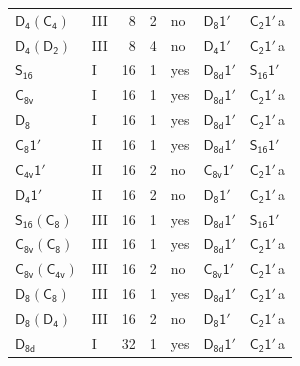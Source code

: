 \documentclass[10pt,a4paper]{article}
\numberwithin{equation}{section}
\newcommand{\grp}[1]{\mathsf{#1}}
\newcommand{\clsletter}[1]{\,{\scriptsize\color{black!55}#1}}
\begin{document}
{\begin{longtable}{@{}llrrlll@{}}
\href{D4-C4.pdf}{$\grp{D_{4}}(\grp{C_{4}})$} & III & 8 & 2 & no & \href{D8-1p.pdf}{$\grp{D_{8}1'}$} & \href{C2-1p.pdf}{$\grp{C_{2}1'}$}\clsletter{a}\\
\href{D4-D2.pdf}{$\grp{D_{4}}(\grp{D_{2}})$} & III & 8 & 4 & no & \href{D4-1p.pdf}{$\grp{D_{4}1'}$} & \href{C2-1p.pdf}{$\grp{C_{2}1'}$}\clsletter{a}\\
\href{../../../rotation/data/pdf/S16.pdf}{$\grp{S_{16}}$} & I & 16 & 1 & yes & \href{D8d-1p.pdf}{$\grp{D_{8d}1'}$} & \href{S16-1p.pdf}{$\grp{S_{16}1'}$}\\
\href{../../../rotation/data/pdf/C8v.pdf}{$\grp{C_{8v}}$} & I & 16 & 1 & yes & \href{D8d-1p.pdf}{$\grp{D_{8d}1'}$} & \href{C2-1p.pdf}{$\grp{C_{2}1'}$}\clsletter{a}\\
\href{../../../rotation/data/pdf/D8.pdf}{$\grp{D_{8}}$} & I & 16 & 1 & yes & \href{D8d-1p.pdf}{$\grp{D_{8d}1'}$} & \href{C2-1p.pdf}{$\grp{C_{2}1'}$}\clsletter{a}\\
\href{C8-1p.pdf}{$\grp{C_{8}1'}$} & II & 16 & 1 & yes & \href{D8d-1p.pdf}{$\grp{D_{8d}1'}$} & \href{S16-1p.pdf}{$\grp{S_{16}1'}$}\\
\href{C4v-1p.pdf}{$\grp{C_{4v}1'}$} & II & 16 & 2 & no & \href{C8v-1p.pdf}{$\grp{C_{8v}1'}$} & \href{C2-1p.pdf}{$\grp{C_{2}1'}$}\clsletter{a}\\
\href{D4-1p.pdf}{$\grp{D_{4}1'}$} & II & 16 & 2 & no & \href{D8-1p.pdf}{$\grp{D_{8}1'}$} & \href{C2-1p.pdf}{$\grp{C_{2}1'}$}\clsletter{a}\\
\href{S16-C8.pdf}{$\grp{S_{16}}(\grp{C_{8}})$} & III & 16 & 1 & yes & \href{D8d-1p.pdf}{$\grp{D_{8d}1'}$} & \href{S16-1p.pdf}{$\grp{S_{16}1'}$}\\
\href{C8v-C8.pdf}{$\grp{C_{8v}}(\grp{C_{8}})$} & III & 16 & 1 & yes & \href{D8d-1p.pdf}{$\grp{D_{8d}1'}$} & \href{C2-1p.pdf}{$\grp{C_{2}1'}$}\clsletter{a}\\
\href{C8v-C4v.pdf}{$\grp{C_{8v}}(\grp{C_{4v}})$} & III & 16 & 2 & no & \href{C8v-1p.pdf}{$\grp{C_{8v}1'}$} & \href{C2-1p.pdf}{$\grp{C_{2}1'}$}\clsletter{a}\\
\href{D8-C8.pdf}{$\grp{D_{8}}(\grp{C_{8}})$} & III & 16 & 1 & yes & \href{D8d-1p.pdf}{$\grp{D_{8d}1'}$} & \href{C2-1p.pdf}{$\grp{C_{2}1'}$}\clsletter{a}\\
\href{D8-D4.pdf}{$\grp{D_{8}}(\grp{D_{4}})$} & III & 16 & 2 & no & \href{D8-1p.pdf}{$\grp{D_{8}1'}$} & \href{C2-1p.pdf}{$\grp{C_{2}1'}$}\clsletter{a}\\
\href{../../../rotation/data/pdf/D8d.pdf}{$\grp{D_{8d}}$} & I & 32 & 1 & yes & \href{D8d-1p.pdf}{$\grp{D_{8d}1'}$} & \href{C2-1p.pdf}{$\grp{C_{2}1'}$}\clsletter{a}\\

\end{longtable}}
\end{document}
